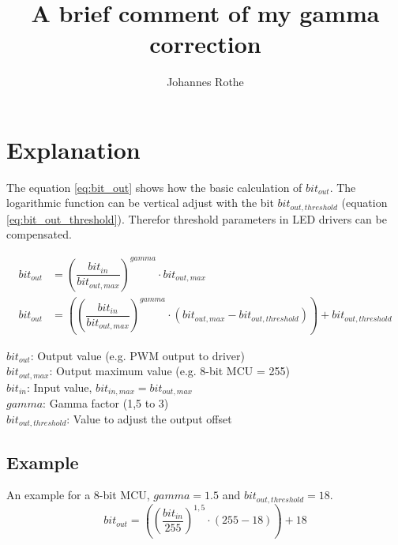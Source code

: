 \documentclass[11pt,a4paper]{article}
\title{A brief comment of my gamma correction}
\author{Johannes Rothe}
\begin{document}
\maketitle 
\section{Explanation}
The equation \ref{eq:bit_out} shows how the basic calculation of $bit_{out}$.
The logarithmic function can be vertical adjust with the bit $bit_{out,threshold}$ (equation \ref{eq:bit_out_threshold}).
Therefor threshold parameters in LED drivers can be compensated.

\begin{align} 
    \label{eq:bit_out}
    bit_{out} &= \left(\dfrac{bit_{in}}{bit_{out,max}} \right)^{gamma} \cdot 
        bit_{out,max} \\
    \label{eq:bit_out_threshold}
    bit_{out} &= \left( \left(\dfrac{bit_{in}}{bit_{out,max}} \right)^{gamma} \cdot 
        (bit_{out,max} - bit_{out,threshold}) \right) + bit_{out,threshold}
\end{align}

\indent $bit_{out}$: Output value (e.g. PWM output to driver)\\
\indent $bit_{out,max}$: Output maximum value (e.g. 8-bit MCU = 255) \\
\indent $bit_{in}$: Input value, $bit_{in,max} = bit_{out,max}$ \\
\indent $gamma$: Gamma factor (1,5 to 3)\\
\indent $bit_{out,threshold}$: Value to adjust the output offset \\

\subsection{Example}
An example for a 8-bit MCU, $gamma = 1.5$ and $bit_{out,threshold} = 18$.\\
\begin{equation}\label{eq:ex}
    bit_{out} = \left( \left(\dfrac{bit_{in}}{255} \right)^{1,5} \cdot 
        (255 - 18) \right) + 18
\end{equation}


% 
\end{document}
